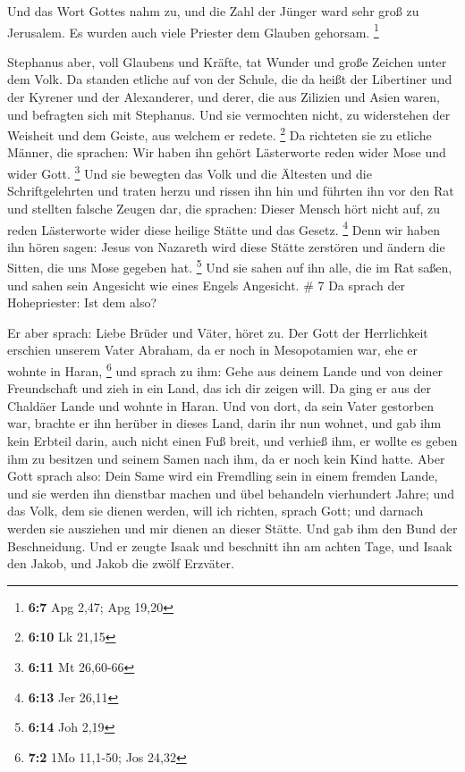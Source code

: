  Und das Wort Gottes nahm zu, und die Zahl der Jünger ward
sehr groß zu Jerusalem. Es wurden auch viele Priester dem Glauben
gehorsam. \footnote{\textbf{6:7} Apg 2,47; Apg 19,20}

 Stephanus aber, voll Glaubens und Kräfte, tat Wunder und
große Zeichen unter dem Volk.  Da standen etliche auf von
der Schule, die da heißt der Libertiner und der Kyrener und der
Alexanderer, und derer, die aus Zilizien und Asien waren, und befragten
sich mit Stephanus.  Und sie vermochten nicht, zu
widerstehen der Weisheit und dem Geiste, aus welchem er redete.
\footnote{\textbf{6:10} Lk 21,15}  Da richteten sie zu
etliche Männer, die sprachen: Wir haben ihn gehört Lästerworte reden
wider Mose und wider Gott. \footnote{\textbf{6:11} Mt 26,60-66}
 Und sie bewegten das Volk und die Ältesten und die
Schriftgelehrten und traten herzu und rissen ihn hin und führten ihn vor
den Rat  und stellten falsche Zeugen dar, die sprachen:
Dieser Mensch hört nicht auf, zu reden Lästerworte wider diese heilige
Stätte und das Gesetz. \footnote{\textbf{6:13} Jer 26,11}
 Denn wir haben ihn hören sagen: Jesus von Nazareth wird
diese Stätte zerstören und ändern die Sitten, die uns Mose gegeben hat.
\footnote{\textbf{6:14} Joh 2,19}  Und sie sahen auf ihn
alle, die im Rat saßen, und sahen sein Angesicht wie eines Engels
Angesicht. \# 7  Da sprach der Hohepriester: Ist dem also?

 Er aber sprach: Liebe Brüder und Väter, höret zu. Der
Gott der Herrlichkeit erschien unserem Vater Abraham, da er noch in
Mesopotamien war, ehe er wohnte in Haran, \footnote{\textbf{7:2} 1Mo
  11,1-50; Jos 24,32}  und sprach zu ihm: Gehe aus deinem
Lande und von deiner Freundschaft und zieh in ein Land, das ich dir
zeigen will.  Da ging er aus der Chaldäer Lande und wohnte
in Haran. Und von dort, da sein Vater gestorben war, brachte er ihn
herüber in dieses Land, darin ihr nun wohnet,  und gab ihm
kein Erbteil darin, auch nicht einen Fuß breit, und verhieß ihm, er
wollte es geben ihm zu besitzen und seinem Samen nach ihm, da er noch
kein Kind hatte.  Aber Gott sprach also: Dein Same wird
ein Fremdling sein in einem fremden Lande, und sie werden ihn dienstbar
machen und übel behandeln vierhundert Jahre;  und das
Volk, dem sie dienen werden, will ich richten, sprach Gott; und darnach
werden sie ausziehen und mir dienen an dieser Stätte.  Und
gab ihm den Bund der Beschneidung. Und er zeugte Isaak und beschnitt ihn
am achten Tage, und Isaak den Jakob, und Jakob die zwölf Erzväter.

